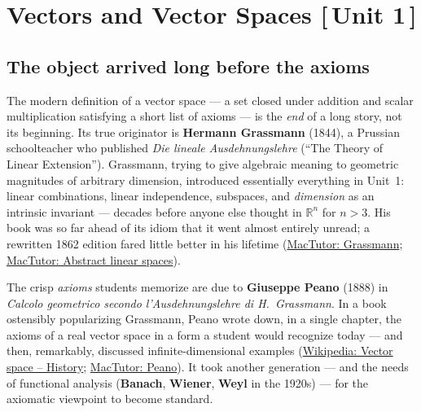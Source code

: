 \documentclass[11pt]{article}
\newcommand{\who}[1]{{\sffamily\bfseries #1}}
\newcommand{\yr}[1]{{\sffamily\color{BrickRed}(#1)}}
\newcommand{\unit}[1]{{\footnotesize\sffamily\color{RoyalBlue}[\,#1\,]}}
\begin{document}
\section{Vectors and Vector Spaces \unit{Unit 1}}

\subsection{The object arrived long before the axioms}
The modern definition of a vector space --- a set closed under addition and
scalar multiplication satisfying a short list of axioms --- is the \emph{end} of a
long story, not its beginning. Its true originator is \who{Hermann Grassmann}
\yr{1844}, a Prussian schoolteacher who published \emph{Die lineale
Ausdehnungslehre} (``The Theory of Linear Extension''). Grassmann, trying to give
algebraic meaning to geometric magnitudes of arbitrary dimension, introduced
essentially everything in Unit~1: linear combinations, linear independence,
subspaces, and \emph{dimension} as an intrinsic invariant --- decades before
anyone else thought in $\mathbb{R}^n$ for $n>3$. His book was so far ahead of its
idiom that it went almost entirely unread; a rewritten 1862 edition fared little
better in his lifetime
(\href{https://mathshistory.st-andrews.ac.uk/Biographies/Grassmann/}{MacTutor:
Grassmann}; \href{https://mathshistory.st-andrews.ac.uk/HistTopics/Abstract_linear_spaces/}{MacTutor:
Abstract linear spaces}).

The crisp \emph{axioms} students memorize are due to \who{Giuseppe Peano}
\yr{1888} in \emph{Calcolo geometrico secondo l'Ausdehnungslehre di H.\ Grassmann}.
In a book ostensibly popularizing Grassmann, Peano wrote down, in a single
chapter, the axioms of a real vector space in a form a student would recognize
today --- and then, remarkably, discussed infinite-dimensional examples
(\href{https://en.wikipedia.org/wiki/Vector_space\#History}{Wikipedia: Vector
space -- History};
\href{https://mathshistory.st-andrews.ac.uk/Biographies/Peano/}{MacTutor:
Peano}). It took another generation --- and the needs of functional analysis
(\who{Banach}, \who{Wiener}, \who{Weyl} in the 1920s) --- for the axiomatic
viewpoint to become standard.
\end{document}
